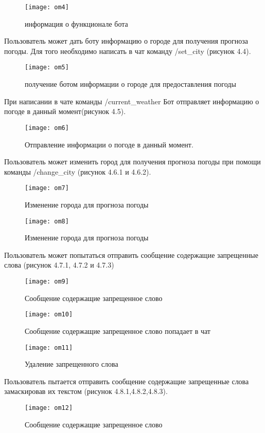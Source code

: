 \begin{figure}
	\centering
	\texttt{[image: om4]}
	\caption{информация о функционале бота }
	\label{om4:image}
\end{figure}
Пользователь может дать боту информацию о городе для получения прогноза погоды. Для того необходимо написать в чат команду /set\_city (рисунок 4.4).
\begin{figure}
	\centering
	\texttt{[image: om5]}
	\caption{получение ботом информации о городе для предоставления погоды}
	\label{om5:image}
\end{figure}
При написании в чате команды /current\_weather Бот отправляет информацию о погоде в данный момент(рисунок 4.5).
\begin{figure}
	\centering
	\texttt{[image: om6]}
	\caption{Отправление информации о погоде в данный момент.}
	\label{om6:image}
\end{figure}
Пользователь может изменить город для получения прогноза погоды при помощи команды /change\_city (рисунок 4.6.1 и 4.6.2).
\begin{figure}
	\centering
	\texttt{[image: om7]}
	\caption{Изменение города для прогноза погоды}
	\label{om7:image}
\end{figure}

\begin{figure}
	\centering
	\texttt{[image: om8]}
	\caption{Изменение города для прогноза погоды}
	\label{om8:image}
\end{figure}
Пользователь может попытаться отправить сообщение содержащие запрещенные слова (рисунок 4.7.1, 4.7.2 и 4.7.3)

\begin{figure}
	\centering
	\texttt{[image: om9]}
	\caption{Сообщение содержащие запрещенное слово}
	\label{om9:image}
\end{figure}

\begin{figure}
	\centering
	\texttt{[image: om10]}
	\caption{Сообщение содержащие запрещенное слово попадает в чат}
	\label{om10:image}
\end{figure}

\begin{figure}
	\centering
	\texttt{[image: om11]}
	\caption{Удаление запрещенного слова}
	\label{om11:image}
\end{figure}
Пользователь пытается отправить сообщение содержащие запрещенные слова замаскировав их текстом (рисунок 4.8.1,4.8.2,4.8.3). 
\begin{figure}
	\centering
	\texttt{[image: om12]}
	\caption{Сообщение содержащие запрещенное слово}
	\label{om12:image}
\end{figure}

